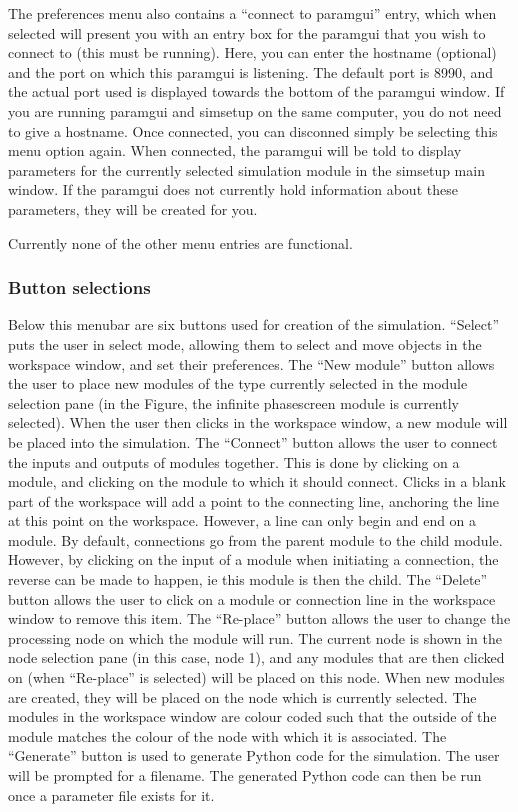 \documentclass{article}
\begin{document}
The preferences menu also contains a ``connect to paramgui'' entry,
which when selected will present you with an entry box for the
paramgui that you wish to connect to (this must be running).  Here,
you can enter the hostname (optional) and the port on which this
paramgui is listening.  The default port is 8990, and the actual port
used is displayed towards the bottom of the paramgui window.  If you
are running paramgui and simsetup on the same computer, you do not
need to give a hostname.  Once connected, you can disconned simply be
selecting this menu option again.  When connected, the paramgui will
be told to display parameters for the currently selected simulation
module in the simsetup main window.  If the paramgui does not
currently hold information about these parameters, they will be
created for you.

Currently none of the other menu entries are functional.  

\subsubsection{Button selections}
Below this menubar are six buttons used for creation of the
simulation.  ``Select'' puts the user in select mode, allowing them to
select and move objects in the workspace window, and set their
preferences.  The ``New module'' button allows the user to place new
modules of the type currently selected in the module selection pane
(in the Figure, the infinite phasescreen module is currently
selected).  When the user then clicks in the workspace window, a new
module will be placed into the simulation.  The ``Connect'' button
allows the user to connect the inputs and outputs of modules together.
This is done by clicking on a module, and clicking on the module to
which it should connect.  Clicks in a blank part of the workspace will
add a point to the connecting line, anchoring the line at this point
on the workspace.  However, a line can only begin and end on a module.
By default, connections go from the parent module to the child module.
However, by clicking on the input of a module when initiating a
connection, the reverse can be made to happen, ie this module is then
the child.  The ``Delete'' button allows the user to click on a module
or connection line in the workspace window to remove this item.  The
``Re-place'' button allows the user to change the processing node on
which the module will run.  The current node is shown in the node
selection pane (in this case, node 1), and any modules that are then
clicked on (when ``Re-place'' is selected) will be placed on this
node.  When new modules are created, they will be placed on the node
which is currently selected.  The modules in the workspace window are
colour coded such that the outside of the module matches the colour of
the node with which it is associated.  The ``Generate'' button is used
to generate Python code for the simulation.  The user will be prompted
for a filename.  The generated Python code can then be run once a
parameter file exists for it.
\end{document}
